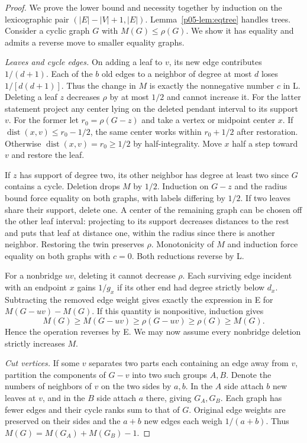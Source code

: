\documentclass[11pt,a4paper]{article}
\newcommand{\dist}{\operatorname{dist}}\newcommand{\ecc}{\operatorname{ecc}}
\begin{document}
\begin{proof}
We prove the lower bound and necessity together by induction on the
lexicographic pair $(|E|-|V|+1,|E|)$. Lemma~\ref{p05-lem:eqtree} handles
trees. Consider a cyclic graph $G$ with $M(G)\le\rho(G)$. We show it
has equality and admits a reverse move to smaller equality graphs.

\emph{Leaves and cycle edges.} On adding a leaf to $v$, its new edge
contributes $1/(d+1)$. Each of the $b$ old edges to a neighbor of degree
at most $d$ loses $1/[d(d+1)]$. Thus the change in $M$ is exactly the
nonnegative number $c$ in L. Deleting a leaf $z$ decreases $\rho$ by at
most $1/2$ and cannot increase it. For the latter statement project any
center lying on the deleted pendant interval to its support $v$. For the
former let $r_0=\rho(G-z)$ and take a vertex or midpoint center $x$.
If $\dist(x,v)\le r_0-1/2$, the same center works within $r_0+1/2$
after restoration. Otherwise $\dist(x,v)=r_0\ge1/2$ by half-integrality.
Move $x$ half a step toward $v$ and restore the leaf.

If $z$ has support of degree two, its other neighbor has degree at least
two since $G$ contains a cycle. Deletion drops $M$ by $1/2$. Induction
on $G-z$ and the radius bound force equality on both graphs, with
labels differing by $1/2$. If two leaves share their support, delete
one. A center of the remaining graph can be chosen off the other leaf
interval: projecting to its support decreases distances to the rest
and puts that leaf at distance one, within the radius since there is
another neighbor. Restoring the twin preserves $\rho$. Monotonicity of
$M$ and induction force equality on both graphs with $c=0$. Both
reductions reverse by L.

For a nonbridge $uv$, deleting it cannot decrease $\rho$. Each surviving
edge incident with an endpoint $x$ gains $1/g_x$ if its other end had
degree strictly below $d_x$. Subtracting the removed edge weight gives
exactly the expression in E for $M(G-uv)-M(G)$. If this quantity is
nonpositive, induction gives
\[
 M(G)\ge M(G-uv)\ge\rho(G-uv)\ge\rho(G)\ge M(G).
\]
Hence the operation reverses by E. We may now assume every nonbridge
deletion strictly increases $M$.

\emph{Cut vertices.} If some $v$ separates two parts each containing an
edge away from $v$, partition the components of $G-v$ into two such
groups $A,B$. Denote the numbers of neighbors of $v$ on the two sides
by $a,b$. In the $A$ side attach $b$ new leaves at $v$, and in the $B$
side attach $a$ there, giving $G_A,G_B$. Each graph has fewer edges
and their cycle ranks sum to that of $G$. Original edge weights are
preserved on their sides and the $a+b$ new edges each weigh $1/(a+b)$.
Thus $M(G)=M(G_A)+M(G_B)-1$.


\end{proof}
\end{document}
